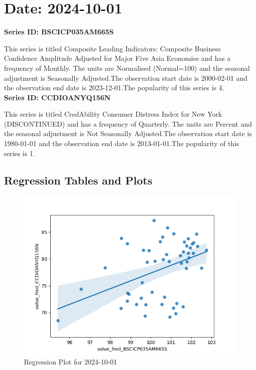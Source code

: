 \section{Date: 2024-10-01}
\noindent \textbf{Series ID: BSCICP035AM665S} 

\noindent This series is titled Composite Leading Indicators: Composite Business Confidence Amplitude Adjusted for Major Five Asia Economies and has a frequency of Monthly. The units are Normalised (Normal=100) and the seasonal adjustment is Seasonally Adjusted.The observation start date is 2000-02-01 and the observation end date is 2023-12-01.The popularity of this series is 4. \\ 

\noindent \textbf{Series ID: CCDIOANYQ156N} 

\noindent This series is titled CredAbility Consumer Distress Index for New York (DISCONTINUED) and has a frequency of Quarterly. The units are Percent and the seasonal adjustment is Not Seasonally Adjusted.The observation start date is 1980-01-01 and the observation end date is 2013-01-01.The popularity of this series is 1. \\ 

\subsection{Regression Tables and Plots}


\begin{figure}
\centering
\includegraphics[scale = 0.9]{plots/plot_2024-10-01.png}
\caption{Regression Plot for 2024-10-01}
\end{figure}
\newpage
